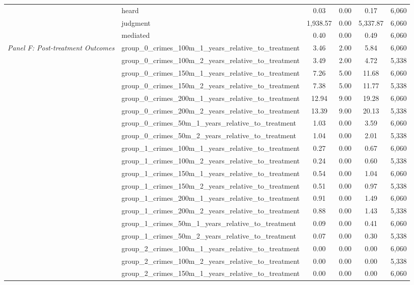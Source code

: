 \begin{tabular}{llcccc}
 & heard & 0.03 & 0.00 & 0.17 & 6,060 \\
 & judgment & 1,938.57 & 0.00 & 5,337.87 & 6,060 \\
 & mediated & 0.40 & 0.00 & 0.49 & 6,060 \\
\cline{1-6}
\multirow[c]{34}{4cm}{\textit{Panel F: Post-treatment Outcomes}} & group_0_crimes_100m_1_years_relative_to_treatment & 3.46 & 2.00 & 5.84 & 6,060 \\
 & group_0_crimes_100m_2_years_relative_to_treatment & 3.49 & 2.00 & 4.72 & 5,338 \\
 & group_0_crimes_150m_1_years_relative_to_treatment & 7.26 & 5.00 & 11.68 & 6,060 \\
 & group_0_crimes_150m_2_years_relative_to_treatment & 7.38 & 5.00 & 11.77 & 5,338 \\
 & group_0_crimes_200m_1_years_relative_to_treatment & 12.94 & 9.00 & 19.28 & 6,060 \\
 & group_0_crimes_200m_2_years_relative_to_treatment & 13.39 & 9.00 & 20.13 & 5,338 \\
 & group_0_crimes_50m_1_years_relative_to_treatment & 1.03 & 0.00 & 3.59 & 6,060 \\
 & group_0_crimes_50m_2_years_relative_to_treatment & 1.04 & 0.00 & 2.01 & 5,338 \\
 & group_1_crimes_100m_1_years_relative_to_treatment & 0.27 & 0.00 & 0.67 & 6,060 \\
 & group_1_crimes_100m_2_years_relative_to_treatment & 0.24 & 0.00 & 0.60 & 5,338 \\
 & group_1_crimes_150m_1_years_relative_to_treatment & 0.54 & 0.00 & 1.04 & 6,060 \\
 & group_1_crimes_150m_2_years_relative_to_treatment & 0.51 & 0.00 & 0.97 & 5,338 \\
 & group_1_crimes_200m_1_years_relative_to_treatment & 0.91 & 0.00 & 1.49 & 6,060 \\
 & group_1_crimes_200m_2_years_relative_to_treatment & 0.88 & 0.00 & 1.43 & 5,338 \\
 & group_1_crimes_50m_1_years_relative_to_treatment & 0.09 & 0.00 & 0.41 & 6,060 \\
 & group_1_crimes_50m_2_years_relative_to_treatment & 0.07 & 0.00 & 0.30 & 5,338 \\
 & group_2_crimes_100m_1_years_relative_to_treatment & 0.00 & 0.00 & 0.00 & 6,060 \\
 & group_2_crimes_100m_2_years_relative_to_treatment & 0.00 & 0.00 & 0.00 & 5,338 \\
 & group_2_crimes_150m_1_years_relative_to_treatment & 0.00 & 0.00 & 0.00 & 6,060 \\

\end{tabular}
